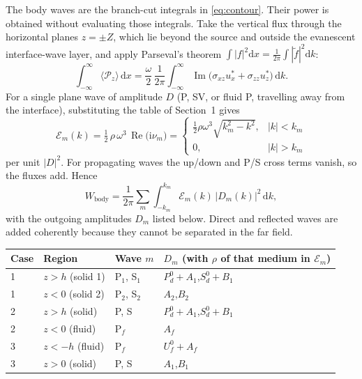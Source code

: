 \documentclass[11pt,a4paper]{article}
\newcommand{\ii}{\mathrm{i}}
\newcommand{\dd}{\mathrm{d}}
\newcommand{\RE}{\operatorname{Re}}
\newcommand{\IM}{\operatorname{Im}}
\begin{document}
The body waves are the branch-cut integrals in \eqref{eq:contour}. Their power is obtained without
evaluating those integrals. Take the vertical flux through the horizontal planes $z=\pm Z$, which lie
beyond the source and outside the evanescent interface-wave layer, and apply Parseval's theorem
$\int|f|^2\dd x=\tfrac1{2\pi}\int|\tilde f|^2\dd k$:
\begin{equation}
  \int_{-\infty}^{\infty}\langle\mathcal P_z\rangle\,\dd x
  =\frac{\omega}{2}\,\frac{1}{2\pi}\int_{-\infty}^{\infty}
  \IM\bigl(\sigma_{xz}u_x^{*}+\sigma_{zz}u_z^{*}\bigr)\,\dd k .
\end{equation}
For a single plane wave of amplitude $D$ (P, SV, or fluid P, travelling away from the interface),
substituting the table of Section~1 gives
\begin{equation}
  \boxed{\ \mathcal E_m(k)=\tfrac12\,\rho\,\omega^3\,\RE\bigl(\ii\nu_m\bigr)
  =\begin{cases}\tfrac12\rho\omega^3\sqrt{k_m^2-k^2}, & |k|<k_m\\ 0,& |k|>k_m\end{cases}\ }
  \label{eq:Em}
\end{equation}
per unit $|D|^2$. For propagating waves the up/down and P/S cross terms vanish, so the fluxes add.
Hence
\begin{equation}
  W_{\mathrm{body}}=\frac{1}{2\pi}\sum_{m}\int_{-k_m}^{k_m}\mathcal E_m(k)\,\bigl|D_m(k)\bigr|^2\,\dd k ,
  \label{eq:Wbody}
\end{equation}
with the outgoing amplitudes $D_m$ listed below. Direct and reflected waves are added coherently
because they cannot be separated in the far field.
\begin{center}
\renewcommand{\arraystretch}{1.35}
\begin{tabular}{@{}llll@{}}
\toprule
Case & Region & Wave $m$ & $D_m$ (with $\rho$ of that medium in $\mathcal E_m$)\\
\midrule
1 & $z>h$ (solid 1) & P$_1$, S$_1$ & $P_d^0+A_1$,\quad $S_d^0+B_1$\\
1 & $z<0$ (solid 2) & P$_2$, S$_2$ & $A_2$,\quad $B_2$\\
2 & $z>h$ (solid)   & P, S       & $P_d^0+A_1$,\quad $S_d^0+B_1$\\
2 & $z<0$ (fluid)   & P$_f$      & $A_f$\\
3 & $z<-h$ (fluid)  & P$_f$      & $U_f^0+A_f$\\
3 & $z>0$ (solid)   & P, S       & $A_1$,\quad $B_1$\\
\bottomrule
\end{tabular}
\end{center}
\end{document}
